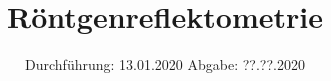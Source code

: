 

\subject{V 44}
\title{Röntgenreflektometrie}
\date{%
  Durchführung: 13.01.2020
  \hspace{3em}
  Abgabe: ??.??.2020
}



\maketitle
\thispagestyle{empty}
\tableofcontents
\newpage






\printbibliography{}


